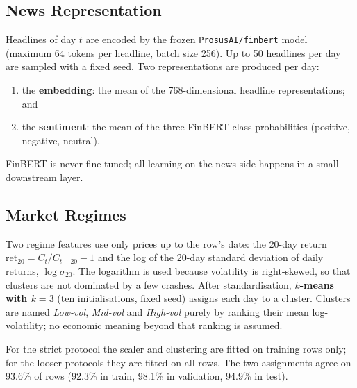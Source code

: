 \subsection{News Representation}
Headlines of day $t$ are encoded by the frozen \texttt{ProsusAI/finbert} model \cite{araci2019} (maximum 64 tokens per headline, batch size 256). Up to 50 headlines per day are sampled with a fixed seed. Two representations are produced per day:
\begin{enumerate}
\item the \textbf{embedding}: the mean of the 768-dimensional headline representations; and
\item the \textbf{sentiment}: the mean of the three FinBERT class probabilities (positive, negative, neutral).
\end{enumerate}
FinBERT is never fine-tuned; all learning on the news side happens in a small downstream layer.

\subsection{Market Regimes}
Two regime features use only prices up to the row's date: the 20-day return $\mathrm{ret}_{20}=C_t/C_{t-20}-1$ and the log of the 20-day standard deviation of daily returns, $\log\sigma_{20}$. The logarithm is used because volatility is right-skewed, so that clusters are not dominated by a few crashes. After standardisation, \textbf{$k$-means with $k=3$} (ten initialisations, fixed seed) assigns each day to a cluster. Clusters are named \emph{Low-vol}, \emph{Mid-vol} and \emph{High-vol} purely by ranking their mean log-volatility; no economic meaning beyond that ranking is assumed.

For the strict protocol the scaler and clustering are fitted on training rows only; for the looser protocols they are fitted on all rows. The two assignments agree on 93.6\% of rows (92.3\% in train, 98.1\% in validation, 94.9\% in test).

